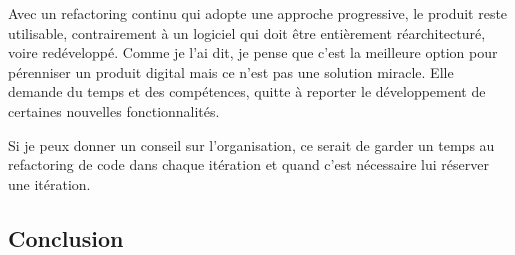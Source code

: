 Avec un refactoring continu qui adopte une approche progressive, le produit reste utilisable, contrairement à un logiciel qui doit être entièrement réarchitecturé, voire redéveloppé. Comme je l’ai dit, je pense que c’est la meilleure option pour pérenniser un produit digital mais ce n’est pas une solution miracle. Elle demande du temps et des compétences, quitte à reporter le développement de certaines nouvelles fonctionnalités.

Si je peux donner un conseil sur l’organisation, ce serait de garder un temps au refactoring de code dans chaque itération et quand c’est nécessaire lui réserver une itération.
\subsection*{Conclusion}

